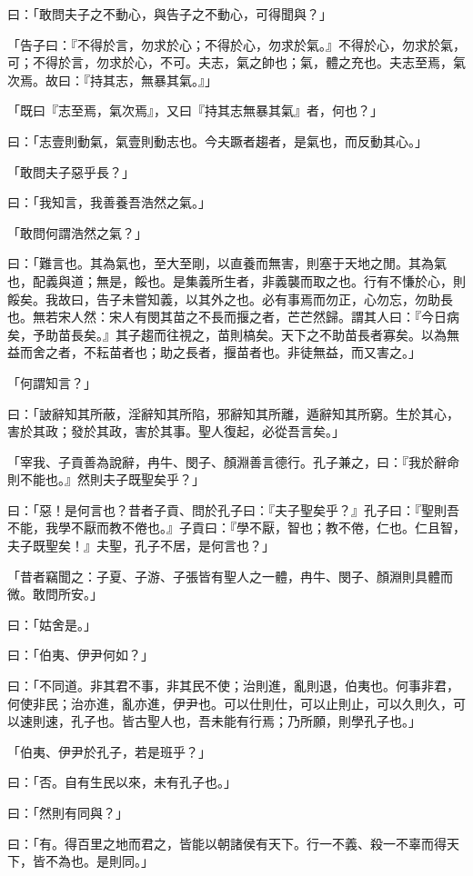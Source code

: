 \documentclass[12pt,a4paper]{ctexbook}
\begin{document}
曰：「敢問夫子之不動心，與告子之不動心，可得聞與？」\par
「告子曰：『不得於言，勿求於心；不得於心，勿求於氣。』不得於心，勿求於氣，可；不得於言，勿求於心，不可。夫志，氣之帥也；氣，體之充也。夫志至焉，氣次焉。故曰：『持其志，無暴其氣。』」\par
「既曰『志至焉，氣次焉』，又曰『持其志無暴其氣』者，何也？」\par
曰：「志壹則動氣，氣壹則動志也。今夫蹶者趨者，是氣也，而反動其心。」\par
「敢問夫子惡乎長？」\par
曰：「我知言，我善養吾浩然之氣。」\par
「敢問何謂浩然之氣？」\par
曰：「難言也。其為氣也，至大至剛，以直養而無害，則塞于天地之閒。其為氣也，配義與道；無是，餒也。是集義所生者，非義襲而取之也。行有不慊於心，則餒矣。我故曰，告子未嘗知義，以其外之也。必有事焉而勿正，心勿忘，勿助長也。無若宋人然：宋人有閔其苗之不長而揠之者，芒芒然歸。謂其人曰：『今日病矣，予助苗長矣。』其子趨而往視之，苗則槁矣。天下之不助苗長者寡矣。以為無益而舍之者，不耘苗者也；助之長者，揠苗者也。非徒無益，而又害之。」\par
「何謂知言？」\par
曰：「詖辭知其所蔽，淫辭知其所陷，邪辭知其所離，遁辭知其所窮。生於其心，害於其政；發於其政，害於其事。聖人復起，必從吾言矣。」\par
「宰我、子貢善為說辭，冉牛、閔子、顏淵善言德行。孔子兼之，曰：『我於辭命則不能也。』然則夫子既聖矣乎？」\par
曰：「惡！是何言也？昔者子貢、問於孔子曰：『夫子聖矣乎？』孔子曰：『聖則吾不能，我學不厭而教不倦也。』子貢曰：『學不厭，智也；教不倦，仁也。仁且智，夫子既聖矣！』夫聖，孔子不居，是何言也？」\par
「昔者竊聞之：子夏、子游、子張皆有聖人之一體，冉牛、閔子、顏淵則具體而微。敢問所安。」\par
曰：「姑舍是。」\par
曰：「伯夷、伊尹何如？」\par
曰：「不同道。非其君不事，非其民不使；治則進，亂則退，伯夷也。何事非君，何使非民；治亦進，亂亦進，伊尹也。可以仕則仕，可以止則止，可以久則久，可以速則速，孔子也。皆古聖人也，吾未能有行焉；乃所願，則學孔子也。」\par
「伯夷、伊尹於孔子，若是班乎？」\par
曰：「否。自有生民以來，未有孔子也。」\par
曰：「然則有同與？」\par
曰：「有。得百里之地而君之，皆能以朝諸侯有天下。行一不義、殺一不辜而得天下，皆不為也。是則同。」\par
\end{document}
